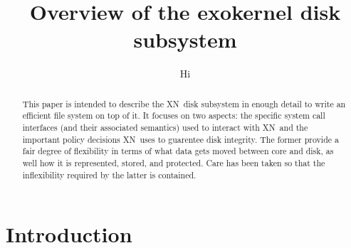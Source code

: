 
\pagestyle{myheadings}
\thispagestyle{myheadings}
\newcommand{\xxx}[0]{{\sc XN}}

\title{Overview of the exokernel disk subsystem}
\author{Hi}

\maketitle

\begin{abstract}

	This paper is intended to describe the \xxx\ disk subsystem in
	enough detail to write an efficient file system on top of it.
	It focuses on two aspects: the specific system call interfaces
	(and their associated semantics) used to interact with
	\xxx\ and the important policy decisions \xxx\ uses to
	guarentee disk integrity.  The former provide a fair degree of
	flexibility in terms of what data gets moved between core and
	disk, as well how it is represented, stored, and protected.
	Care has been taken so that the inflexibility required by the
	latter is contained.

\end{abstract}

\section{Introduction}

